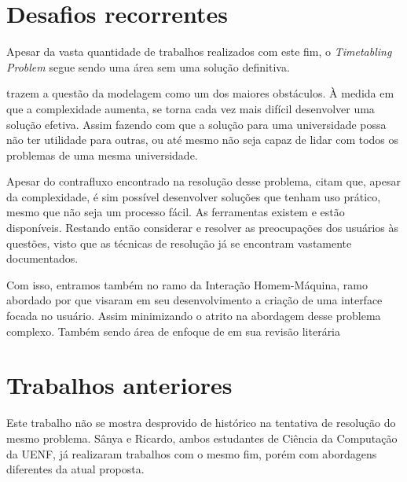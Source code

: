 \section{Desafios recorrentes} %

Apesar da vasta quantidade de trabalhos realizados com este fim, o \textit{Timetabling Problem} segue sendo uma área sem uma solução definitiva.

 trazem a questão da modelagem como um dos maiores obstáculos. À medida em que a complexidade aumenta, se torna cada vez mais difícil desenvolver uma solução efetiva. Assim fazendo com que a solução para uma universidade possa não ter utilidade para outras, ou até mesmo não seja capaz de lidar com todos os problemas de uma mesma universidade.

Apesar do contrafluxo encontrado na resolução desse problema,  citam que, apesar da complexidade, é sim possível desenvolver soluções que tenham uso prático, mesmo que não seja um processo fácil. As ferramentas existem e estão disponíveis. Restando então considerar e resolver as preocupações dos usuários às questões, visto que as técnicas de resolução já se encontram vastamente documentados.

Com isso, entramos também no ramo da Interação Homem-Máquina, ramo abordado por  que visaram em seu desenvolvimento a criação de uma interface focada no usuário. Assim minimizando o atrito na abordagem desse problema complexo. Também sendo área de enfoque de  em sua revisão literária





\section{Trabalhos anteriores} %

Este trabalho não se mostra desprovido de histórico na tentativa de resolução do mesmo problema. Sânya e Ricardo, ambos estudantes de Ciência da Computação da UENF, já realizaram trabalhos com o mesmo fim, porém com abordagens diferentes da atual proposta.

